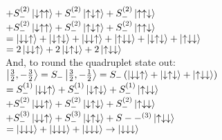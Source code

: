 \documentclass[12pt]{article}
\begin{document}
\begin{enumerate}[label=\alph*)]
\hspace*{5.5em}$ + S_-^{(2)}\ket{\downarrow\uparrow\uparrow} + S_-^{(2)}\ket{\uparrow\downarrow\uparrow} + S_-^{(2)}\ket{\uparrow\uparrow\downarrow}$\vspace{0.5em}\\
\hspace*{5.5em}$ + S_-^{(2)}\ket{\downarrow\uparrow\uparrow} + S_-^{(2)}\ket{\uparrow\downarrow\uparrow} + S_-^{(2)}\ket{\uparrow\uparrow\downarrow}$\vspace{0.5em}\\
\hspace*{3.5em}$ = \ket{\downarrow\downarrow\uparrow} + \ket{\downarrow\uparrow\downarrow} + \ket{\downarrow\downarrow\uparrow} + \ket{\uparrow\downarrow\downarrow} + \ket{\downarrow\uparrow\downarrow} + \ket{\uparrow\downarrow\downarrow}$\vspace{0.5em}\\
\hspace*{3.5em}$= 2\ket{\downarrow\downarrow\uparrow} + 2\ket{\downarrow\uparrow\downarrow} + 2 \ket{\uparrow\downarrow\downarrow}$\vspace{0.5em}\\
And, to round the quadruplet state out:\vspace{0.5em}\\
$\ket{\frac{3}{2}, -\frac{3}{2}} = S_-\ket{\frac{3}{2}, -\frac{1}{2}} = S_-\left(\ket{\downarrow\downarrow\uparrow} + \ket{\downarrow\uparrow\downarrow} + \ket{\uparrow\downarrow\downarrow}\right)$\vspace{0.5em}\\
\hspace*{3.5em}$ = S_-^{(1)}\ket{\downarrow\downarrow\uparrow} + S_-^{(1)}\ket{\downarrow\uparrow\downarrow} + S_-^{(1)}\ket{\uparrow\downarrow\downarrow}$\vspace{0.5em}\\
\hspace*{5.5em}$ + S_-^{(2)}\ket{\downarrow\downarrow\uparrow} + S_-^{(2)}\ket{\downarrow\uparrow\downarrow} + S_-^{(2)}\ket{\uparrow\downarrow\downarrow}$\vspace{0.5em}\\
\hspace*{5.5em}$ + S_-^{(3)}\ket{\downarrow\downarrow\uparrow} + S_-^{(3)}\ket{\downarrow\uparrow\downarrow} + S--^{(3)}\ket{\uparrow\downarrow\downarrow}$\vspace{0.5em}\\
\hspace*{3.5em}$=\ket{\downarrow\downarrow\downarrow} + \ket{\downarrow\downarrow\downarrow} + \ket{\downarrow\downarrow\downarrow} \rightarrow \ket{\downarrow\downarrow\downarrow}$\vspace{1.5em}\\

\end{enumerate}
\end{document}
